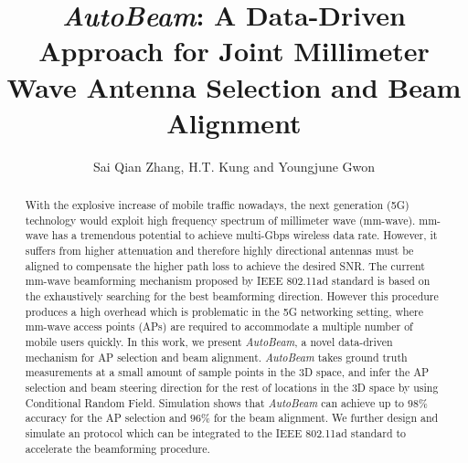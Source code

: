 \documentclass[conference]{IEEEtran}
\begin{document}
\title{\emph{AutoBeam}: A Data-Driven Approach for Joint Millimeter Wave Antenna Selection and Beam Alignment}


\author{Sai Qian Zhang, H.T. Kung and Youngjune Gwon\\
}


\maketitle
\begin{abstract}
	
With the explosive increase of mobile traffic nowadays, the next generation (5G) technology would exploit high frequency spectrum of millimeter wave (mm-wave). mm-wave has a tremendous potential to achieve multi-Gbps wireless data rate. However, it suffers from higher attenuation and therefore highly directional antennas must be aligned to compensate the higher path loss to achieve the desired SNR. The current mm-wave beamforming mechanism proposed by IEEE 802.11ad standard is based on the exhaustively searching for the best beamforming direction. However this procedure produces a high overhead which is problematic in the 5G networking setting, where mm-wave access points (APs) are required to accommodate a multiple number of mobile users quickly. In this work, we present \emph{AutoBeam}, a novel data-driven mechanism for AP selection and beam alignment. \emph{AutoBeam} takes ground truth measurements at a small amount of sample points in the 3D space, and infer the AP selection and beam steering direction for the rest of locations in the 3D space by using Conditional Random Field. Simulation shows that \emph{AutoBeam} can achieve up to $98\%$ accuracy for the AP selection and $96\%$ for the beam alignment. We further design and simulate an protocol which can be integrated to the IEEE 802.11ad standard to accelerate the beamforming procedure. 

\end{abstract}
\end{document}
